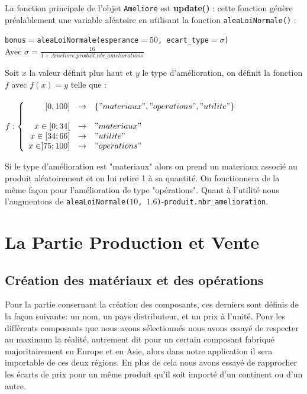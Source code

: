 La fonction principale de l'objet \texttt{Ameliore} est \textbf{update()} : cette fonction génère préalablement une variable aléatoire en utilisant la fonction \texttt{aleaLoiNormale()} : 
	\begin{center}
		\texttt{bonus}$=$\texttt{aleaLoiNormale(esperance$=50$, ecart\_type$=\sigma$)}\\
		Avec $\sigma = \frac{16}{1+Ameliore.produit.nbr\_ameliorations}$ 			\end{center}
Soit $x$ la valeur définit plus haut et $y$ le type d'amélioration, on définit la fonction $f$ avec $f(x)=y$ telle que : \\\\
$
f : \left\{ 
\begin{array}{r c l}
[0, 100] &\to  &\{"materiaux", "operations", "utilite"\} \\\\
x\in [0;34[ &\to &"materiaux"\\
x\in [34;66] &\to &"utilite"\\
x\in ]75;100] &\to &"operations"
\end{array}
\right.
$

Si le type d'amélioration est "materiaux" alors on prend un materiaux associé au produit aléatoirement et on lui retire 1 à sa quantité. On fonctionnera de la même façon pour l'amélioration de type "opérations". Quant à l'utilité nous l'augmentons de \texttt{aleaLoiNormale($10$, $1.6$)}-\texttt{produit.nbr\_amelioration}.









\section{La Partie Production et Vente}



\subsection{Création des matériaux et des opérations}



Pour la partie consernant la création des composants, ces derniers sont définis de la façon suivante: un nom, un pays distributeur, et un prix à l'unité. Pour les différents composants que nous avons sélectionnés nous avons essayé de respecter au maximum la réalité, autrement dit pour un certain composant fabriqué majoritairement en Europe et en Asie, alors dans notre application il sera importable de ces deux régions. En plus de cela nous avons essayé de rapprocher les écarts de prix pour un même produit qu’il soit importé d’un continent ou d’un autre.

